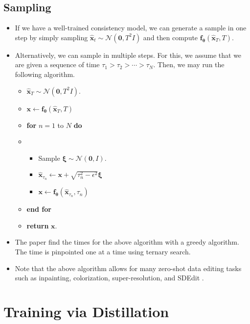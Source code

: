 \documentclass[10pt]{article}
\newcommand{\ve}[1]{\mathbf{#1}}
\newcommand{\ves}[1]{\boldsymbol{#1}}
\newcommand{\mcal}[1]{\mathcal{#1}}
\begin{document}
\subsection{Sampling}

\begin{itemize}
  \item If we have a well-trained consistency model, we can generate a sample in one step by simply sampling $\hat{\ve{x}}_t \sim \mcal{N}(\ve{0},T^2I)$ and then compute $\ve{f}_{\ves{\theta}}(\hat{\ve{x}}_T, T)$.
  
  \item Alternatively, we can sample in multiple steps. For this, we assume that we are given a sequence of time $\tau_1 > \tau_2 > \dotsb > \tau_{N}$. Then, we may run the following algorithm.
  \begin{itemize}
    \item[] $\hat{\ve{x}}_{T} \sim \mcal{N}(\ve{0},T^2I)$.
    \item[] $\ve{x} \leftarrow \ve{f}_{\ves{\theta}}(\hat{\ve{x}}_T, T)$
    \item[] {\bf for} $n = 1$ to $N$ {\bf do}
    \item[] \begin{itemize}
      \item[] Sample $\ves{\xi} \sim \mcal{N}(\ve{0},I)$.
      \item[] $\hat{\mathbf{x}}_{\tau_n} \leftarrow \ve{x} + \sqrt{ \tau_n^2 - \epsilon^2 } \ves{\xi}$
      \item[] $\ve{x} \leftarrow \ve{f}_{\ves{\theta}}(\hat{\mathbf{x}}_{\tau_n}, \tau_n)$
    \end{itemize}    
    \item[] {\bf end for}
    \item[] {\bf return} $\ve{x}$.
  \end{itemize}

  \item The paper find the times for the above algorithm with a greedy algorithm. The time is pinpointed one at a time using ternary search.
  
  \item Note that the above algorithm allows for many zero-shot data editing tasks such as inpainting, colorization, super-resolution, and SDEdit \cite{Meng:2021}.
\end{itemize}

\section{Training via Distillation}
\end{document}
